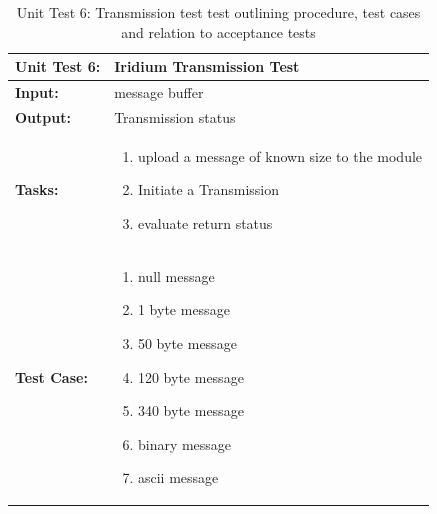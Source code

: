 \begin{table}[H]
    \centering
    \caption{Unit Test 6: Transmission test  test outlining procedure, test cases and relation to acceptance tests}
    \begin{tabular}{|m{}|m{}|}
    \hline
       \textbf{Unit Test 6: }  &  Iridium Transmission Test\\
       \hline
        \textbf{Input: } &  message buffer\\
        \hline
        \textbf{Output: } & Transmission status\\
        \hline
        \textbf{Tasks: } & \begin{enumerate}
        \vspace{1mm}
            \item upload a message of known size to the module
            \item Initiate a Transmission
            \item evaluate return status
        \end{enumerate}\\
        \hline
        \textbf{Test Case: } & \begin{enumerate}
            \vspace{1mm}
            \item null message
            \item 1 byte message
            \item 50 byte message
            \item 120 byte message
            \item 340 byte message
            \item binary message
            \item ascii message
            
        \end{enumerate}\\
        \hline
    \end{tabular}

    \label{tab:UT006}
\end{table}

